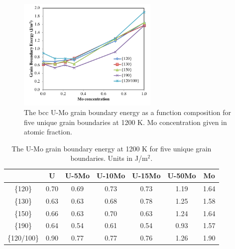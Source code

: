 \documentclass[review]{elsarticle}
\begin{document}
\begin{figure}[h]
 \centering
 \includegraphics[width=0.6\textwidth]{uvsmo1200A.png} 
 \caption{The bcc U-Mo grain boundary energy as a function composition for five unique grain boundaries at 1200 K. Mo concentration given in atomic fraction.}
 \label{fig:umo1200}
\end{figure}

\begin{table}[h]
\caption{The U-Mo grain boundary energy at 1200 K for five unique grain boundaries. Units in J/m$^{2}$. } \label{tab:umo1200}
\begin{center}
\begin{tabular}{|c|c|c|c|c|c|c|}
	\hline
 & U & U-5Mo & U-10Mo & U-15Mo & U-50Mo & Mo \\
\hline
\{120\}	 & 0.70 & 0.69 & 0.73 & 0.73 & 1.19 & 1.64 \\
\{130\}	 & 0.63 & 0.63 & 0.68 & 0.78 & 1.25 & 1.58 \\
\{150\}	 & 0.66 & 0.63 & 0.70 & 0.63 & 1.24 & 1.64 \\
\{190\}	 & 0.64 & 0.54 & 0.61 & 0.54 & 0.93 & 1.57 \\
\{120/100\} & 0.90 & 0.77 & 0.77 & 0.76 & 1.26 & 1.90 \\
 	 \hline
\end{tabular}
\end{center}
\label{default}
\end{table}

\FloatBarrier
\end{document}

